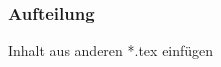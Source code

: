\begin{frame}
    \frametitle{Aufteilung}
    \begin{block}{Inhalt aus anderen *.tex einfügen}
        
    \end{block}
\end{frame}
